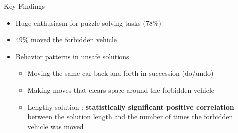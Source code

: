 \begin{frame}{Key Findings}
\begin{itemize}
\item Huge enthusiasm for puzzle solving tasks (78\%)
\item 49\% moved the forbidden vehicle
\item Behavior patterns in unsafe solutions
\begin{itemize}
\item Moving the same car back and forth in succession (do/undo)
\item Making moves that clears space around the forbidden vehicle
\item Lengthy solution : \textbf{statistically significant positive correlation} between the solution length and the number of times the forbidden vehicle was moved
\end{itemize}

\end{itemize}

\end{frame}

